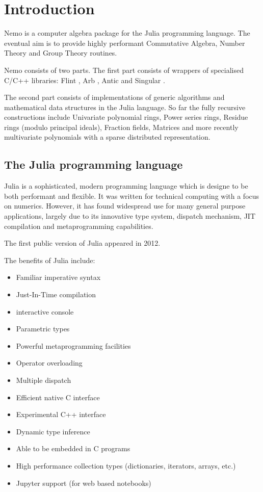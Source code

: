 \documentclass{sig-alternate-05-2015}
\begin{document}
\section{Introduction}

Nemo is a computer algebra package for the Julia programming language. The eventual aim is
to provide highly performant Commutative Algebra, Number Theory and Group Theory routines.

Nemo consists of two parts. The first part consists of wrappers of specialised C/C++
libraries: Flint \cite{flint}, Arb \cite{Arb}, Antic \cite{Antic} and Singular
\cite{singular}.

The second part consists of implementations of generic algorithms and mathematical data
structures in the Julia language. So far the fully recursive constructions include
Univariate polynomial rings, Power series rings, Residue rings (modulo principal ideals),
Fraction fields, Matrices and more recently multivariate polynomials with a sparse
distributed representation.

\subsection{The Julia programming language}

Julia \cite{julia} is a sophisticated, modern programming language which is designe
to be both performant and flexible. It was written for technical computing with a
focus on numerics. However, it has found widespread use for many general purpose
applications, largely due to its innovative type system, dispatch mechanism, JIT
compilation and metaprogramming capabilities.

The first public version of Julia appeared in 2012. 

The benefits of Julia include:

\begin{itemize}
\item Familiar imperative syntax
\item Just-In-Time compilation
\item interactive console
\item Parametric types
\item Powerful metaprogramming facilities
\item Operator overloading
\item Multiple dispatch
\item Efficient native C interface
\item Experimental C++ interface
\item Dynamic type inference
\item Able to be embedded in C programs
\item High performance collection types (dictionaries, iterators, arrays, etc.)
\item Jupyter support (for web based notebooks)
\end{itemize}
\end{document}
